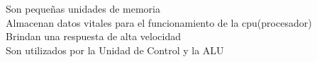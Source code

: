 \documentclass[preview]{standalone}
\begin{document}
Son pequeñas unidades de memoria\\Almacenan datos vitales
para el funcionamiento de la cpu(procesador)\\Brindan una respuesta de alta velocidad\\Son utilizados por la Unidad de Control y la ALU\\
\end{document}
